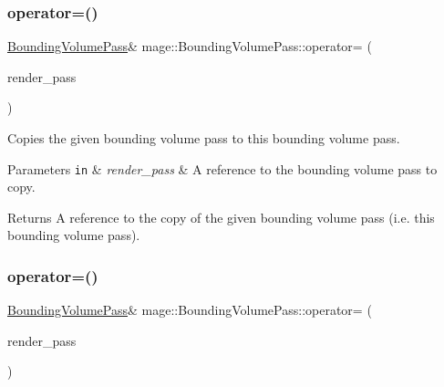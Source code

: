 \subsubsection{\texorpdfstring{operator=()}{operator=()}\hspace{0.1cm}{\footnotesize\ttfamily [1/2]}}
{\footnotesize\ttfamily \hyperlink{classmage_1_1_bounding_volume_pass}{Bounding\+Volume\+Pass}\& mage\+::\+Bounding\+Volume\+Pass\+::operator= (\begin{DoxyParamCaption}\item[{const \hyperlink{classmage_1_1_bounding_volume_pass}{Bounding\+Volume\+Pass} \&}]{render\+\_\+pass }\end{DoxyParamCaption})\hspace{0.3cm}{\ttfamily [delete]}}

Copies the given bounding volume pass to this bounding volume pass.


\begin{DoxyParams}[1]{Parameters}
\mbox{\tt in}  & {\em render\+\_\+pass} & A reference to the bounding volume pass to copy. \\
\hline
\end{DoxyParams}
\begin{DoxyReturn}{Returns}
A reference to the copy of the given bounding volume pass (i.\+e. this bounding volume pass). 
\end{DoxyReturn}
\hypertarget{classmage_1_1_bounding_volume_pass_a3887d5ffbb5e175187004f0b057ddcaa}{}\label{classmage_1_1_bounding_volume_pass_a3887d5ffbb5e175187004f0b057ddcaa} 
\subsubsection{\texorpdfstring{operator=()}{operator=()}\hspace{0.1cm}{\footnotesize\ttfamily [2/2]}}
{\footnotesize\ttfamily \hyperlink{classmage_1_1_bounding_volume_pass}{Bounding\+Volume\+Pass}\& mage\+::\+Bounding\+Volume\+Pass\+::operator= (\begin{DoxyParamCaption}\item[{\hyperlink{classmage_1_1_bounding_volume_pass}{Bounding\+Volume\+Pass} \&\&}]{render\+\_\+pass }\end{DoxyParamCaption})\hspace{0.3cm}{\ttfamily [delete]}}

